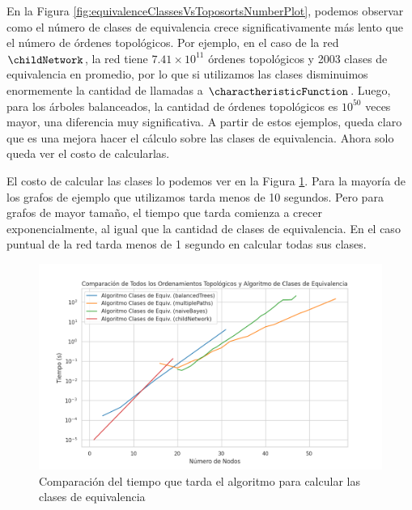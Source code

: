 En la Figura \ref{fig:equivalenceClassesVsToposortsNumberPlot}, podemos observar como el número de clases de equivalencia crece significativamente más lento que el número de órdenes topológicos. Por ejemplo, en el caso de la red $\childNetwork$, la red tiene $7.41\times10^{11}$ órdenes topológicos y 2003 clases de equivalencia en promedio, por lo que si utilizamos las clases disminuimos enormemente la cantidad de llamadas a $\charactheristicFunction$. Luego, para los árboles balanceados, la cantidad de órdenes topológicos es $10^{50}$ veces mayor, una diferencia muy significativa. A partir de estos ejemplos, queda claro que es una mejora hacer el cálculo sobre las clases de equivalencia. Ahora solo queda ver el costo de calcularlas. 

El costo de calcular las clases lo podemos ver en la Figura \ref{fig:equivalenceClassesTimePlot}. Para la mayoría de los grafos de ejemplo que utilizamos tarda menos de 10 segundos. Pero para grafos de mayor tamaño, el tiempo que tarda comienza a crecer exponencialmente, al igual que la cantidad de clases de equivalencia. En el caso puntual de la red \childNetwork tarda menos de 1 segundo en calcular todas sus clases. 


\begin{figure}[ht]
    \centering
    \includegraphics[width=1\linewidth]{img/equivalentClasses_time.png}
    \caption[Caption for image]{Comparación del tiempo que tarda el algoritmo para calcular las clases de equivalencia}
    \label{fig:equivalenceClassesTimePlot}
\end{figure}

